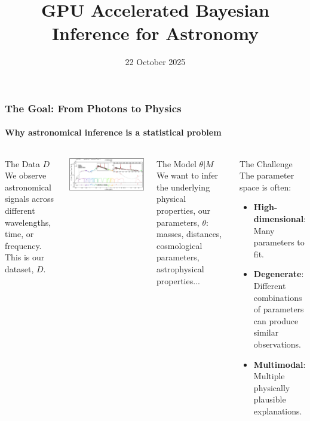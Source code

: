 \documentclass[aspectratio=169]{beamer}
\title{GPU Accelerated Bayesian Inference for Astronomy}
\date{22 October 2025}
\newcommand{\keyterm}[1]{\textbf{\textcolor{C0}{#1}}}
\begin{document}
\begin{frame}
    \titlepage
\end{frame}


\begin{frame}
    \frametitle{The Goal: From Photons to Physics}
    \framesubtitle{Why astronomical inference is a statistical problem}
    \begin{columns}[T]
        \begin{block}{The Data $D$}
            We observe astronomical signals across different wavelengths, time, or frequency. This is our dataset, $D$.
        \end{block}
        \includegraphics[width=\textwidth]{figures/sed.png}
        \begin{block}{The Model $\theta|M$}
            We want to infer the underlying physical properties, our parameters, $\theta$: masses, distances, cosmological parameters, astrophysical properties...
        \end{block}
        \begin{block}{The Challenge}
            The parameter space is often:
            \begin{itemize}
                \item \keyterm{High-dimensional}: Many parameters to fit.
                \item \keyterm{Degenerate}: Different combinations of parameters can produce similar observations.
                \item \keyterm{Multimodal}: Multiple physically plausible explanations.
            \end{itemize}
        \end{block}
    \end{columns}
\end{frame}
\end{document}
